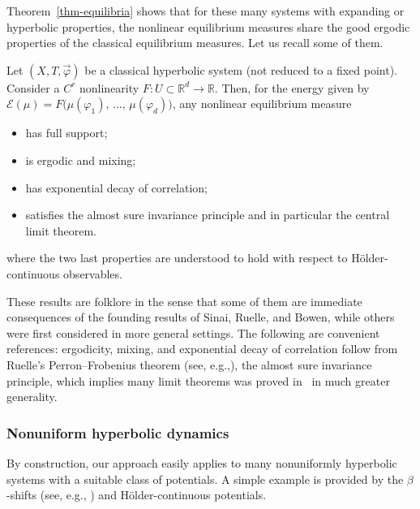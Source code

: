 \documentclass[AHL, Unicode, longabstracts,published]{cedram}
\theoremstyle{plain}
\theoremstyle{plain}
\newcommand{\pot}{\varphi}
\newcommand*\8{\infty}
\newcommand\RR{\mathbb{R}}
\newcommand{\En}{\mathcal{E}}
\begin{document}
Theorem~\ref{thm-equilibria} shows that for these many systems with expanding or hyperbolic properties, the nonlinear equilibrium measures share the good ergodic properties of the classical equilibrium measures. Let us recall some of them.

\begin{coro}[Folklore]\label{cor-individual}
Let $(X,T,\vec\pot)$ be a classical hyperbolic system (not reduced to a fixed point). Consider a $C^r$ nonlinearity $F:U\subset\RR^d\to\RR$. Then, for the energy given by $\En(\mu) = F\big(\mu(\pot_1),\,\dots,\,\mu(\pot_d)\big)$, any nonlinear equilibrium measure
\begin{itemize}
\item has full support;
\item is ergodic and mixing;
\item has exponential decay of correlation;
\item satisfies the almost sure invariance principle and in particular the central limit theorem.
\end{itemize}
where the two last properties are understood to hold with respect to H\"older-con\-ti\-nuous observables.
\end{coro}

These results are folklore in the sense that some of them are immediate consequences of the founding results of Sinai, Ruelle, and Bowen, while others were first considered in more general settings. The following are convenient references: ergodicity, mixing, and exponential decay of correlation follow from Ruelle's Perron--Frobenius theorem (see, e.g.,\cite[chapter~1]{Baladi-book}), the almost sure invariance principle, which implies many limit theorems was proved in~\cite{MN05} in much greater generality.


\subsubsection{Nonuniform hyperbolic dynamics}

By construction, our approach easily applies to many nonuniformly hyperbolic systems with a suitable class of potentials. A simple example is provided by the $\beta$-shifts (see, e.g., \cite{Reniy-1957}) and H\"older-continuous potentials.
\end{document}
